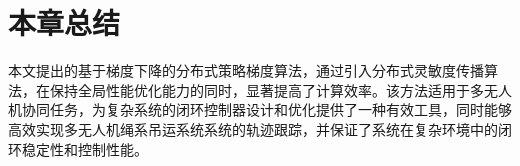 \documentclass[lang=chs, degree=master, blindreview=true, winfonts=true]{yanputhesis}
\begin{document}




\section{本章总结}

本文提出的基于梯度下降的分布式策略梯度算法，通过引入分布式灵敏度传播算法，在保持全局性能优化能力的同时，显著提高了计算效率。该方法适用于多无人机协同任务，为复杂系统的闭环控制器设计和优化提供了一种有效工具，同时能够高效实现多无人机绳系吊运系统系统的轨迹跟踪，并保证了系统在复杂环境中的闭环稳定性和控制性能。

\cleardoublepage
\end{document}
